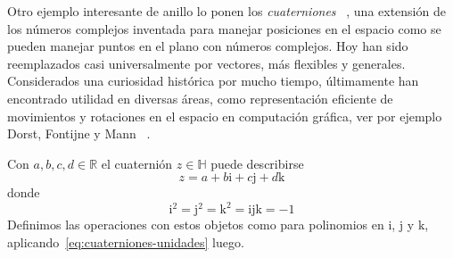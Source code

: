   Otro ejemplo interesante de anillo lo ponen los \emph{cuaterniones}~%
    \cite{hamilton44:_quaternions},
  una extensión de los números complejos
  inventada para manejar posiciones en el espacio
  como se pueden manejar puntos en el plano con números complejos.
  Hoy han sido reemplazados casi universalmente por vectores,
  más flexibles y generales.
  Considerados una curiosidad histórica por mucho tiempo,
  últimamente han encontrado utilidad en diversas áreas,
  como representación eficiente de movimientos y rotaciones en el espacio%
  en computación gráfica,
  ver por ejemplo Dorst, Fontijne y Mann~%
    \cite{dorst07:_geometric_algebra_comp_sci}.

  Con \(a, b, c, d \in \mathbb{R}\)
  el cuaternión \(z \in \mathbb{H}\) puede describirse
  \begin{equation}
    \label{eq:definicion-cuaternion}
    z = a + b \mathrm{i} + c \mathrm{j} + d \mathrm{k}
  \end{equation}
  donde
  \begin{equation}
    \label{eq:cuaterniones-unidades}
    \mathrm{i}^2
      = \mathrm{j}^2
      = \mathrm{k}^2
      = \mathrm{i} \mathrm{j} \mathrm{k} = -1
  \end{equation}
  Definimos las operaciones con estos objetos
  como para polinomios en \(\mathrm{i}\), \(\mathrm{j}\) y \(\mathrm{k}\),
  aplicando~\eqref{eq:cuaterniones-unidades} luego.

